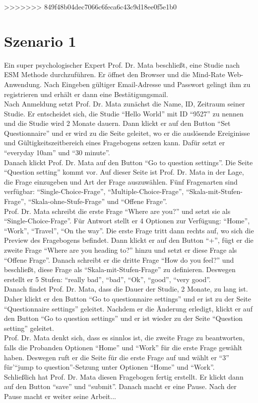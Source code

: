 \documentclass[a4paper]{scrreprt}
\begin{document}
>>>>>>> 849f48b04dec7066c6feca6c43c9d18ee0f5e1b0
		\section{Szenario 1}
                Ein super psychologischer Expert Prof. Dr. Mata beschließt, eine Studie nach ESM Methode durchzuf\"uhren. Er \"offnet den Browser und die Mind-Rate Web-Anwendung. Nach Eingeben g\"ultiger Email-Adresse und Passwort gelingt ihm zu registrieren und erh\"alt er dann eine Bestätigungsmail. \\
                Nach Anmeldung setzt Prof. Dr. Mata zun\"achst die Name, ID, Zeitraum seiner Studie. Er entscheidet sich, die Studie ``Hello World'' mit ID ``9527'' zu nennen und die Studie wird 2 Monate dauern. Dann klickt er auf den Button ``Set Questionnaire'' und er wird zu die Seite geleitet, wo er die auslösende Ereiginisse und G\"ultigkeitszeitbereich eines Fragebogens setzen kann. Daf\"ur setzt er ``everyday 10am'' und ``30 minute''. \\
                Danach klickt Prof. Dr. Mata auf den Button ``Go to question settings''. Die Seite ``Question setting'' kommt vor. Auf dieser Seite ist Prof. Dr. Mata in der Lage, die Frage einzugeben und Art der Frage auszuw\"ahlen. F\"unf Fragenarten sind verf\"ugbar: ``Single-Choice-Frage'', ``Multiple-Choice-Frage'', ``Skala-mit-Stufen-Frage'', ``Skala-ohne-Stufe-Frage'' und ``Offene Frage''. \\
                Prof. Dr. Mata schreibt die erste Frage ``Where are you?'' und setzt sie als ``Single-Choice-Frage''. Für Antwort stellt er 4 Optionen zur Verf\"ugung: ``Home'', ``Work'', ``Travel'', ``On the way''. Die erste Frage tritt dann rechts auf, wo sich die Preview des Fragebogens befindet. Dann klickt er auf den Button ``+'', f\"ugt er die zweite Frage ``Where are you heading to?'' hinzu und setzt er diese Frage als ``Offene Frage''. Danach schreibt er die dritte Frage ``How do you feel?'' und beschließt, diese Frage als ``Skala-mit-Stufen-Frage'' zu definieren. Deswegen erstellt er 5 Stufen: ``really bad'', ``bad'', ``Ok'', ``good'', ``very good''. \\
                Danach findet Prof. Dr. Mata, dass die Dauer der Studie, 2 Monate,  zu lang ist. Daher klickt er den Button ``Go to questionnaire settings'' und er ist zu der Seite ``Questionnaire settings'' geleitet. Nachdem er die \"Anderung erledigt, klickt er auf den Button ``Go to question settings'' und er ist wieder zu der Seite ``Question setting'' geleitet. \\
                Prof. Dr. Mata denkt sich, dass es sinnlos ist, die zweite Frage zu beantworten, falls die Probanden Optionen ``Home'' und ``Work'' f\"ur die erste Frage gew\"ahlt haben. Deswegen ruft er die Seite f\"ur die erste Frage auf und w\"ahlt er ``3'' f\"ur'``jump to question''-Setzung unter Optionen ``Home'' und ``Work''. \\
                Schließlich hat Prof. Dr. Mata diesen Fragebogen fertig erstellt. Er klickt dann auf den Button ``save'' und ``submit''. Danach macht er eine Pause. Nach der Pause macht er weiter seine Arbeit...\\
\end{document}
